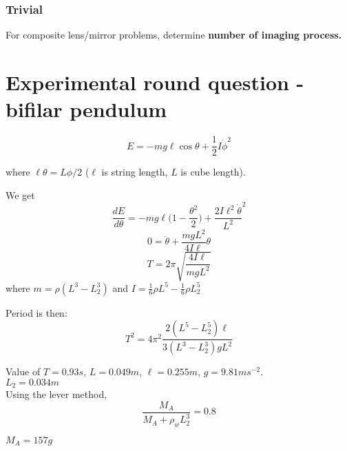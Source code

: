 \subsubsection{Trivial}
For composite lens/mirror problems, determine \textbf{number of imaging process.}

\section{Experimental round question - bifilar pendulum}
\begin{equation}
    E=-mg\ell\cos\theta + \frac{1}{2}I\dot{\phi}^2
\end{equation}

where $\ell \theta = L\phi /2$ ($\ell$ is string length, $L$ is cube length). 

We get 
\begin{equation}
    \frac{dE}{d\theta}=-mg\ell \bigg(1-\frac{\theta^2}{2} \bigg)+\frac{2 I \ell^2 \dot{\theta}}{L^2}^2
\end{equation}
\begin{equation}
    0=\ddot{\theta}+\frac{mgL^2}{4 I \ell}\theta
\end{equation}
\begin{equation}
    T=2\pi \sqrt{\frac{4 I \ell}{mgL^2}}
\end{equation}
where $m=\rho (L^3-L_2^3)$ and $I=\frac{1}{6}\rho L^5-\frac{1}{6} \rho L_2^5$

Period is then:
\begin{equation}
    T^2=4\pi^2 \frac{2 (L^5-L_2^5) \ell}{3 (L^3-L_2^3)gL^2}
\end{equation}

Value of $T=0.93s$, $L=0.049m$, $\ell=0.255m$, $g=9.81 ms^{-2}$.\\

$\boxed{ L_2 = 0.034m}$\\

Using the lever method, 
\begin{equation}
    \frac{M_A}{M_A+\rho_w L_2^3}=0.8
\end{equation}

$\boxed{M_A=157g}$
